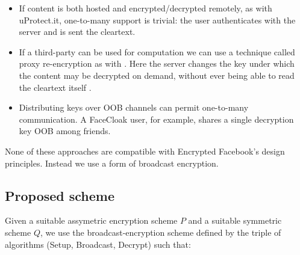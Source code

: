 \begin{itemize}

    \item If content is both hosted and encrypted/decrypted remotely, as with uProtect.it, one-to-many support is trivial: the user authenticates with the server and is sent the cleartext.
    
    \item If a third-party can be used for computation we can use a technique called proxy re-encryption as with \cite{flybynight}. Here the server changes the key under which the content may be decrypted on demand, without ever being able to read the cleartext itself \cite{proxy}.
    
    \item Distributing keys over \ac{OOB} channels can permit one-to-many communication. A FaceCloak user, for example, shares a single decryption key \ac{OOB} among friends.

\end{itemize}

None of these approaches are compatible with Encrypted Facebook's design principles. Instead we use a form of broadcast encryption.


\FloatBarrier
\subsection{Proposed scheme}
    
    Given a suitable assymetric encryption scheme $P$ and a suitable symmetric scheme $Q$, we use the broadcast-encryption scheme defined by the triple of algorithms {\sc (Setup, Broadcast, Decrypt)} such that:
    
